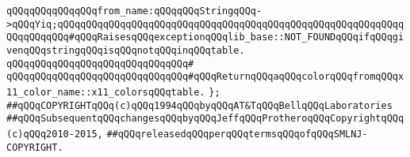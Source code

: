 \verb|qQQqqQQqqQQqqQQqfrom_name:qQQqqQQqStringqQQq->qQQqYiq;qQQqqQQqqQQqqQQqqQQqqQQqqQQqqQQqqQQqqQQqqQQqqQQqqQQqqQQqqQQqqQQqqQQqqQQq#qQQqRaisesqQQqexceptionqQQqlib_base::NOT_FOUNDqQQqifqQQqgivenqQQqstringqQQqisqQQqnotqQQqinqQQqtable.|\newline
\verb|qQQqqQQqqQQqqQQqqQQqqQQqqQQqqQQq#|\newline
\verb|qQQqqQQqqQQqqQQqqQQqqQQqqQQqqQQq#qQQqReturnqQQqaqQQqcolorqQQqfromqQQqx11_color_name::x11_colorsqQQqtable.|\newline
\verb|};|\newline
\newline
\newline
\verb|##qQQqCOPYRIGHTqQQq(c)qQQq1994qQQqbyqQQqAT&TqQQqBellqQQqLaboratories|\newline
\verb|##qQQqSubsequentqQQqchangesqQQqbyqQQqJeffqQQqProtheroqQQqCopyrightqQQq(c)qQQq2010-2015,|\newline
\verb|##qQQqreleasedqQQqperqQQqtermsqQQqofqQQqSMLNJ-COPYRIGHT.|\newline

